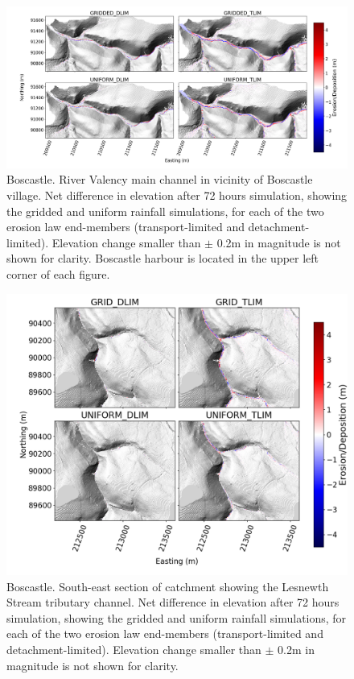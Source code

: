 %
%

\begin{figure}
\includegraphics[width=25cm]{chp06_figures_scripts/figure_boscastle_erosion_diff_ensemble.png}
\caption{Boscastle. River Valency main channel in vicinity of Boscastle village. Net difference in elevation after 72 hours simulation, showing the gridded and uniform rainfall simulations, for each of the two erosion law end-members (transport-limited and detachment-limited). Elevation change smaller than \(\pm\) 0.2m in magnitude is not shown for clarity. Boscastle harbour is located in the upper left corner of each figure.}
\label{fig_boscastle_2dplan_erosion_ensemble}
\end{figure}

\begin{figure}
\includegraphics[width=18cm]{chp06_figures_scripts/figure_boscastle_erosion_diff_ensemble_SE.png}
\caption{Boscastle. South-east section of catchment showing the Lesnewth Stream tributary channel. Net difference in elevation after 72 hours simulation, showing the gridded and uniform rainfall simulations, for each of the two erosion law end-members (transport-limited and detachment-limited). Elevation change smaller than \(\pm\) 0.2m in magnitude is not shown for clarity. }
\label{fig_boscastle_2dplan_erosion_ensemble_SE}
\end{figure}


